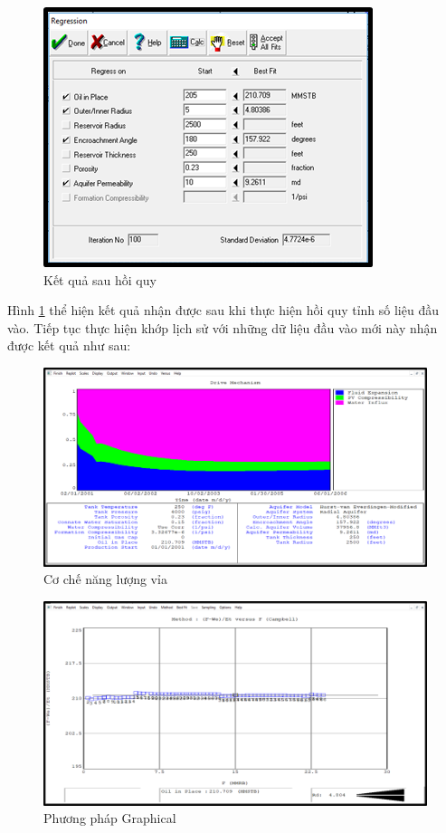 \documentclass[12pt,a4paper]{report}
\begin{document}
        \clearpage
        \begin{figure}[h]
        	\centering
            \includegraphics[scale=1.6]{Fig/after_regression.png}
            \caption{Kết quả sau hồi quy}
            \label{fig:after_reg}
        \end{figure}
        \noindent
Hình \ref{fig:after_reg} thể hiện kết quả nhận được sau khi thực hiện hồi quy tỉnh số liệu đầu vào. Tiếp tục thực hiện khớp lịch sử với những dữ liệu đầu vào mới này nhận được kết quả như sau:
		\begin{figure}[h]
        	\centering
            \includegraphics[scale=0.6]{Fig/ener_fixed.png}
            \caption{Cơ chế năng lượng vỉa}
            \label{fig:ener_fixed}
        \end{figure}
        \begin{figure}[h]
        	\centering
            \includegraphics[scale=0.6]{Fig/gra_fixed.png}
            \caption{Phương pháp Graphical}
            \label{fig:gra_fixed}
        \end{figure}
\end{document}
